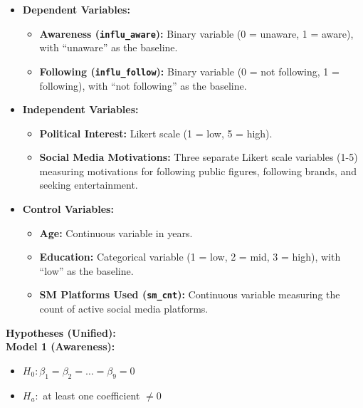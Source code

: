 \documentclass[12pt, a4paper]{article}
\begin{document}
	\begin{itemize}[itemsep=0.3em]
		
		\item \textbf{Dependent Variables:}
		
		\begin{itemize}
			
			\item \textbf{Awareness (\texttt{influ\_aware}):} Binary variable (0 = unaware, 1 = aware), with ``unaware'' as the baseline.
			
			\item \textbf{Following (\texttt{influ\_follow}):} Binary variable (0 = not following, 1 = following), with ``not following'' as the baseline.
			
		\end{itemize}
		
		\item \textbf{Independent Variables:}
		
		\begin{itemize}
			
			\item \textbf{Political Interest:} Likert scale (1 = low, 5 = high).
			
			\item \textbf{Social Media Motivations:} Three separate Likert scale variables (1-5) measuring motivations for following public figures, following brands, and seeking entertainment.
			
		\end{itemize}
		
		\item \textbf{Control Variables:}
		
		\begin{itemize}
			
			\item \textbf{Age:} Continuous variable in years.
			
			\item \textbf{Education:} Categorical variable (1 = low, 2 = mid, 3 = high), with ``low'' as the baseline.
			
			\item \textbf{SM Platforms Used (\texttt{sm\_cnt}):} Continuous variable measuring the count of active social media platforms.
			
		\end{itemize}
		
	\end{itemize}
	
	\textbf{Hypotheses (Unified):} \\
	\textbf{Model 1 (Awareness):}
	\begin{itemize}[itemsep=0em]
		\item $H_0: \beta_1 = \beta_2 = \dots = \beta_9 = 0$
		\item $H_a:$ at least one coefficient $\neq 0$
	\end{itemize}
	
\end{document}
